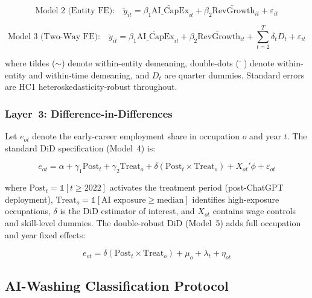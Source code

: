 \documentclass[12pt, a4paper]{article}
\begin{document}
\begin{equation}
\text{Model 2 (Entity FE):}\quad
\tilde{y}_{it} = \beta_1 \widetilde{\text{AI\_CapEx}}_{it}
              + \beta_2 \widetilde{\text{RevGrowth}}_{it} + \varepsilon_{it}
\label{eq:m2}
\end{equation}

\begin{equation}
\text{Model 3 (Two-Way FE):}\quad
\ddot{y}_{it} = \beta_1 \ddot{\text{AI\_CapEx}}_{it}
             + \beta_2 \ddot{\text{RevGrowth}}_{it}
             + \sum_{t=2}^{T} \delta_t D_t + \varepsilon_{it}
\label{eq:m3}
\end{equation}

where tildes ($\sim$) denote within-entity demeaning, double-dots ($\ddot{\phantom{x}}$)
denote within-entity and within-time demeaning, and $D_t$ are quarter dummies. Standard
errors are HC1 heteroskedasticity-robust throughout.

\subsubsection{Layer~3: Difference-in-Differences}

Let $e_{ot}$ denote the early-career employment share in occupation $o$ and year $t$.
The standard DiD specification (Model~4) is:

\begin{equation}
e_{ot} = \alpha + \gamma_1 \text{Post}_{t} + \gamma_2 \text{Treat}_{o}
       + \delta (\text{Post}_{t} \times \text{Treat}_{o})
       + X_{ot}'\phi + \varepsilon_{ot}
\label{eq:did}
\end{equation}

where $\text{Post}_{t} = \mathbb{1}[t \geq 2022]$ activates the treatment period
(post-ChatGPT deployment), $\text{Treat}_{o} = \mathbb{1}[\text{AI exposure} \geq \text{median}]$
identifies high-exposure occupations, $\delta$ is the DiD estimator of interest, and
$X_{ot}$ contains wage controls and skill-level dummies. The double-robust DiD (Model~5)
adds full occupation and year fixed effects:

\begin{equation}
e_{ot} = \delta (\text{Post}_{t} \times \text{Treat}_{o})
       + \mu_o + \lambda_t + \eta_{ot}
\label{eq:drdd}
\end{equation}

\subsection{AI-Washing Classification Protocol}
\end{document}
